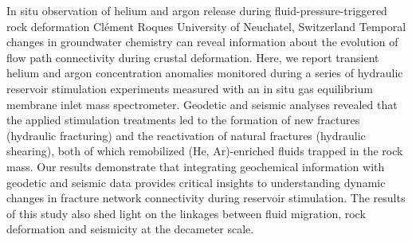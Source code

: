 \begin{conf-abstract}
{In situ observation of helium and argon release during fluid-pressure-triggered rock deformation}
{Clément Roques}
{University of Neuchatel, Switzerland}
{Temporal changes in groundwater chemistry can reveal information about the evolution of flow path connectivity during crustal deformation. Here, we report transient helium and argon concentration anomalies monitored during a series of hydraulic reservoir stimulation experiments measured with an in situ gas equilibrium membrane inlet mass spectrometer. Geodetic and seismic analyses revealed that the applied stimulation treatments led to the formation of new fractures (hydraulic fracturing) and the reactivation of natural fractures (hydraulic shearing), both of which remobilized (He, Ar)-enriched fluids trapped in the rock mass. Our results demonstrate that integrating geochemical information with geodetic and seismic data provides critical insights to understanding dynamic changes in fracture network connectivity during reservoir stimulation. The results of this study also shed light on the linkages between fluid migration, rock deformation and seismicity at the decameter scale.}
\end{conf-abstract}
